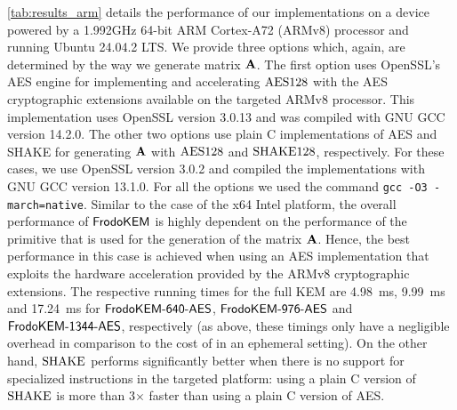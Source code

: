 \else

\autoref{tab:results_arm} details the performance of our implementations on a device powered by a 1.992GHz 64-bit ARM Cortex-A72 (ARMv8)
processor and running Ubuntu 24.04.2 LTS.
We provide three options which, again, are determined by the way we generate matrix $\mathbf{A}$. The first option uses OpenSSL's AES engine for implementing and accelerating $\textrm{\upshape\mdseries AES}128$ with the AES cryptographic extensions available on the targeted ARMv8 processor. This implementation uses OpenSSL version 3.0.13 and was compiled with GNU GCC version 14.2.0.
The other two options use plain C implementations of AES and SHAKE for generating $\mathbf{A}$ with $\textrm{\upshape\mdseries AES}128$ and $\textrm{\upshape\mdseries SHAKE}128$, respectively. 
For these cases, we use OpenSSL version 3.0.2 and compiled the implementations with GNU GCC version 13.1.0.
For all the options we used the command {\tt gcc -O3 -march=native}. 
Similar to the case of the x64 Intel platform, the overall performance of $\textsf{\upshape\mdseries FrodoKEM}$ is highly
dependent on the performance of the primitive that is used for the generation of the matrix $\mathbf{A}$.
Hence, the best performance in this case is achieved when using an AES implementation that
exploits the hardware acceleration provided by the ARMv8 cryptographic extensions.
The respective running times for the full KEM are 4.98~ms, 9.99~ms and 17.24~ms for $\textsf{\upshape\mdseries FrodoKEM-640-AES}$, $\textsf{\upshape\mdseries FrodoKEM-976-AES}$ and $\textsf{\upshape\mdseries FrodoKEM-1344-AES}$, respectively
(as above, these timings only have a negligible overhead in comparison to the cost of \eFrodoKEM in an ephemeral setting).
On the other hand, $\textrm{\upshape\mdseries SHAKE}$ performs significantly better when
there is no support for specialized instructions in the targeted platform: using a plain C version
of $\textrm{\upshape\mdseries SHAKE}$ is more than 3$\times$ faster than using a plain C version of AES.
\fi

